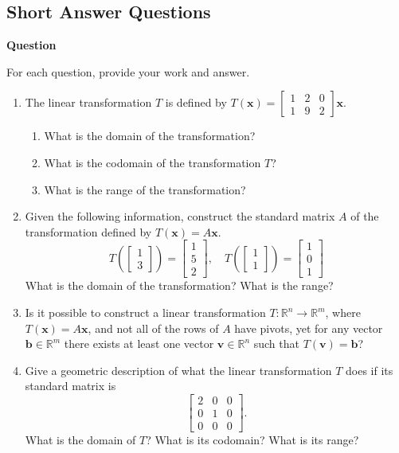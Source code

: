 \documentclass[10pt, titlepage]{article}
\newcounter{question}
\newenvironment{newquestion}
{
	\noindent\textbf{Question \thequestion}
}
{
\stepcounter{question}
\par
}
\renewcommand{\vec}[1]{\bm{#1}}
\begin{document}
\subsection{Short Answer Questions}
\begin{newquestion}
	For each question, provide your work and answer.
	\begin{enumerate}
		\item The linear transformation \(T\) is defined by \(T(\vec{x}) = \begin{bmatrix}1 & 2 & 0 \\ 1 & 9 & 2\end{bmatrix}\vec{x}\).
			\begin{enumerate}
				\item What is the domain of the transformation?
				\item What is the codomain of the transformation \(T\)?
				\item What is the range of the transformation?
			\end{enumerate}

		\item Given the following information, construct the standard matrix \(A\) of the transformation defined by \(T(\vec{x}) = A\vec{x}\).
			\[T\left(\begin{bmatrix}1 \\ 3\end{bmatrix}\right) = \begin{bmatrix}1 \\ 5 \\ 2\end{bmatrix}, \quad T\left(\begin{bmatrix}1 \\ 1\end{bmatrix}\right) = \begin{bmatrix}1 \\ 0 \\ 1\end{bmatrix}\]
			What is the domain of the transformation? What is the range?

		\item Is it possible to construct a linear transformation \(T \colon \mathbb{R}^n \to \mathbb{R}^m\), where \(T(\vec{x}) = A\vec{x}\), and not all of 
			the rows of \(A\) have pivots, yet for any vector \(\vec{b} \in \mathbb{R}^m\) there exists at least one vector \(\vec{v} \in \mathbb{R}^n\) 
			such that \(T(\vec{v}) = \vec{b}\)?

		\item Give a geometric description of what the linear transformation \(T\) does if its standard matrix is \[\begin{bmatrix}2 & 0 & 0 \\ 0 & 1 & 0 \\ 0 & 0 & 0\end{bmatrix}.\]
			What is the domain of \(T\)? What is its codomain? What is its range?


\end{enumerate}
\end{newquestion}
\end{document}
